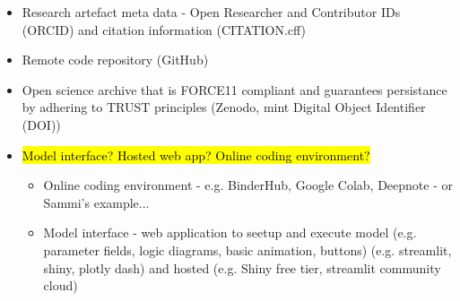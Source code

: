 \begin{itemize}
\begin{itemize}
    \end{itemize}
    \item Research artefact meta data - Open Researcher and Contributor IDs (ORCID) and citation information (CITATION.cff)
    \item Remote code repository (GitHub)
    \item Open science archive that is FORCE11 compliant and guarantees persistance by adhering to TRUST principles (Zenodo, mint Digital Object Identifier (DOI))\autocite{monks_towards_2024}
    \item \hl{Model interface? Hosted web app? Online coding environment?}
    \begin{itemize}
        \item Online coding environment - e.g. BinderHub, Google Colab, Deepnote - or Sammi's example...
        \item Model interface - web application to seetup and execute model (e.g. parameter fields, logic diagrams, basic animation, buttons) (e.g. streamlit, shiny, plotly dash) and hosted (e.g. Shiny free tier, streamlit community cloud)
    \end{itemize}
\end{itemize}

